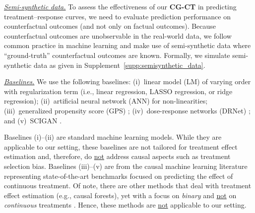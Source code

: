 \documentclass[sigconf]{acmart}
\newcommand{\framework}{\textbf{\mbox{CG-CT}}\xspace}
\begin{document}
\noindent
\underline{\emph{Semi-synthetic data.}} To assess the effectiveness of our \framework in predicting treatment--response curves, we need to evaluate prediction performance on counterfactual outcomes (and not only on factual outcomes). Because counterfactual outcomes are unobservable in the real-world data, we follow common practice in machine learning \cite{Schwab2020, Bica2020} and make use of semi-synthetic data where ``ground-truth'' counterfactual outcomes are known. Formally, we simulate semi-synthetic data as given in Supplement~\ref{supp:semisynthetic_data}.

\noindent
\underline{\emph{Baselines.}} We use the following baselines: (i)~linear model (LM) of varying order with regularization term (i.e., linear regression, LASSO regression, or ridge regression); (ii)~artificial neural network (ANN) for non-linearities; (iii)~generalized propensity score (GPS) \cite{Hirano2004}; (iv)~dose-response networks (DRNet) \cite{Schwab2020}; and (v)~SCIGAN \cite{Bica2020}. 

Baselines (i)--(ii) are standard machine learning models. While they are applicable to our setting, these baselines are not tailored for treatment effect estimation and, therefore, do \underline{not} address causal aspects such as treatment selection bias. Baselines (iii)--(v) are from the causal machine learning literature representing state-of-the-art benchmarks focused on predicting the effect of continuous treatment. Of note, there are other methods that deal with treatment effect estimation (e.g., causal forests), yet with a focus on \emph{binary} and \underline{not} on \emph{continuous} treatments \cite{Johansson2016, Shalit2017, Yoon2018, Athey2019, Hatt2021}. Hence, these methods are \underline{not} applicable to our setting. 

\end{document}
